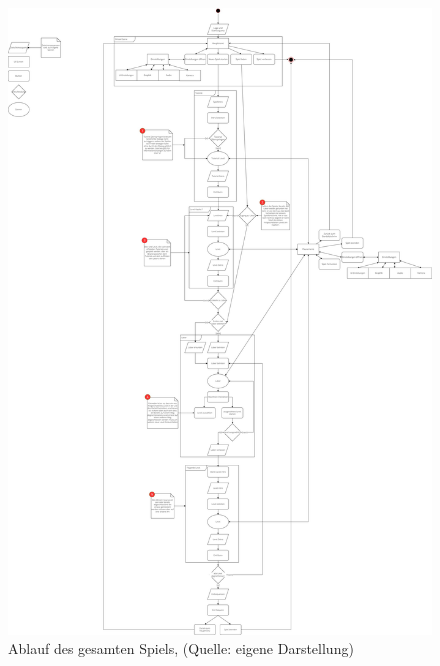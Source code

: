 \begin{figure}[p]
\centering
\includegraphics[width=1\linewidth]{content/pictures/main_loop.jpg}
\caption{Ablauf des gesamten Spiels, (Quelle: eigene Darstellung)}
\label{fig:main_loop}
\end{figure}

